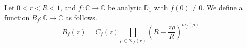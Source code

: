 \begin{definition}[BlaschkeB]
\label{BlaschkeB}
\leanok
Let $0 < r < R < 1$, and $f:\mathbb{C}\to\mathbb{C}$ be analytic $\overline{\mathbb{D}_1}$ with
    $f(0)\neq 0$. We define a function $B_f:\mathbb{C}\to\mathbb{C}$ as follows.
    $$B_f(z)=C_f(z)\prod_{\rho\in\mathcal{K}_f(r)}
      \left(R-\frac{z\overline{\rho}}{R}\right)^{m_f(\rho)}$$
\end{definition}
